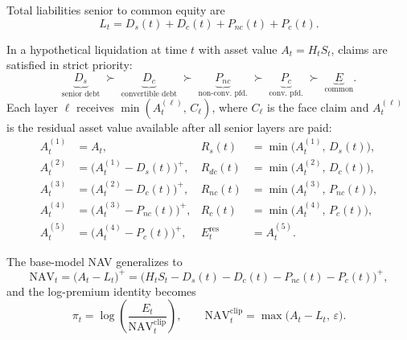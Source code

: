 \noindent Total liabilities senior to common equity are
\begin{equation}\label{eq:total_senior}
  L_t = D_s(t) + D_c(t) + P_{nc}(t) + P_c(t).
\end{equation}

\begin{definition}\label{def:waterfall}
In a hypothetical liquidation at time $t$ with asset value
$A_t = H_t S_t$, claims are satisfied in strict priority:
\begin{equation}\label{eq:waterfall}
  \underbrace{D_s}_{\text{senior debt}}
  \;\succ\;
  \underbrace{D_c}_{\text{convertible debt}}
  \;\succ\;
  \underbrace{P_{nc}}_{\text{non-conv.\ pfd.}}
  \;\succ\;
  \underbrace{P_c}_{\text{conv.\ pfd.}}
  \;\succ\;
  \underbrace{E}_{\text{common}}.
\end{equation}
Each layer $\ell$ receives $\min(A_t^{(\ell)},\, C_\ell)$, where $C_\ell$ is
the face claim and $A_t^{(\ell)}$ is the residual asset value available after
all senior layers are paid:
\begin{align}
  A_t^{(1)} &= A_t, &
  R_s(t)     &= \min\bigl(A_t^{(1)},\, D_s(t)\bigr), \label{eq:wf_senior}\\
  A_t^{(2)} &= \bigl(A_t^{(1)} - D_s(t)\bigr)^+, &
  R_{dc}(t)  &= \min\bigl(A_t^{(2)},\, D_c(t)\bigr), \\
  A_t^{(3)} &= \bigl(A_t^{(2)} - D_c(t)\bigr)^+, &
  R_{nc}(t)  &= \min\bigl(A_t^{(3)},\, P_{nc}(t)\bigr), \\
  A_t^{(4)} &= \bigl(A_t^{(3)} - P_{nc}(t)\bigr)^+, &
  R_c(t)     &= \min\bigl(A_t^{(4)},\, P_c(t)\bigr), \\
  A_t^{(5)} &= \bigl(A_t^{(4)} - P_c(t)\bigr)^+, &
  E_t^{\text{res}} &= A_t^{(5)}. \label{eq:wf_equity}
\end{align}
\end{definition}

\noindent The base-model NAV generalizes to
\begin{equation}\label{eq:nav_extended}
  \mathrm{NAV}_t = \bigl(A_t - L_t\bigr)^+
  = \bigl(H_t S_t - D_s(t) - D_c(t) - P_{nc}(t) - P_c(t)\bigr)^+,
\end{equation}
and the log-premium identity becomes
\begin{equation}\label{eq:pi_extended}
  \pi_t = \log\!\left(\frac{E_t}{\mathrm{NAV}_t^{\mathrm{clip}}}\right),
  \qquad
  \mathrm{NAV}_t^{\mathrm{clip}} = \max\bigl(A_t - L_t,\, \varepsilon\bigr).
\end{equation}

